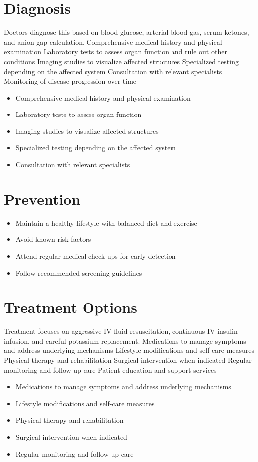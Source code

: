 \section{Diagnosis}
Doctors diagnose this based on blood glucose, arterial blood gas, serum ketones, and anion gap calculation. Comprehensive medical history and physical examination Laboratory tests to assess organ function and rule out other conditions Imaging studies to visualize affected structures Specialized testing depending on the affected system Consultation with relevant specialists Monitoring of disease progression over time

\begin{itemize}[noitemsep]
  \item Comprehensive medical history and physical examination
  \item Laboratory tests to assess organ function
  \item Imaging studies to visualize affected structures
  \item Specialized testing depending on the affected system
  \item Consultation with relevant specialists
\end{itemize}
\section{Prevention}
\begin{itemize}[noitemsep]
  \item Maintain a healthy lifestyle with balanced diet and exercise
  \item Avoid known risk factors
  \item Attend regular medical check-ups for early detection
  \item Follow recommended screening guidelines
\end{itemize}
\section{Treatment Options}
Treatment focuses on aggressive IV fluid resuscitation, continuous IV insulin infusion, and careful potassium replacement. Medications to manage symptoms and address underlying mechanisms Lifestyle modifications and self-care measures Physical therapy and rehabilitation Surgical intervention when indicated Regular monitoring and follow-up care Patient education and support services

\begin{itemize}[noitemsep]
  \item Medications to manage symptoms and address underlying mechanisms
  \item Lifestyle modifications and self-care measures
  \item Physical therapy and rehabilitation
  \item Surgical intervention when indicated
  \item Regular monitoring and follow-up care
\end{itemize}
